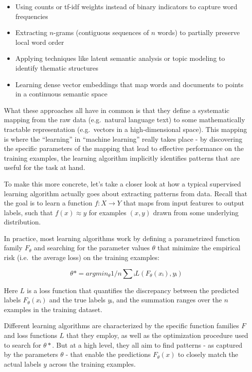 \documentclass[
  9pt,
  letterpaper,
  abstract,
  titlepage]{scrbook}
\begin{document}
\begin{itemize}
\item
  Using counts or tf-idf weights instead of binary indicators to capture
  word frequencies
\item
  Extracting \(n\)-grams (contiguous sequences of \(n\) words) to
  partially preserve local word order
\item
  Applying techniques like latent semantic analysis or topic modeling to
  identify thematic structures
\item
  Learning dense vector embeddings that map words and documents to
  points in a continuous semantic space
\end{itemize}

What these approaches all have in common is that they define a
systematic mapping from the raw data (e.g.~natural language text) to
some mathematically tractable representation (e.g.~vectors in a
high-dimensional space). This mapping is where the ``learning'' in
``machine learning'' really takes place - by discovering the specific
parameters of the mapping that lead to effective performance on the
training examples, the learning algorithm implicitly identifies patterns
that are useful for the task at hand.

To make this more concrete, let's take a closer look at how a typical
supervised learning algorithm actually goes about extracting patterns
from data. Recall that the goal is to learn a function \(f: X → Y\) that
maps from input features to output labels, such that \(f(x) ≈ y\) for
examples \((x,y)\) drawn from some underlying distribution.

In practice, most learning algorithms work by defining a parametrized
function family \(F_θ\) and searching for the parameter values \(θ\)
that minimize the empirical risk (i.e.~the average loss) on the training
examples:

\[θ* = argmin_θ 1/n ∑ᵢ L(F_θ(xᵢ), yᵢ)\]

Here \(L\) is a loss function that quantifies the discrepancy between
the predicted labels \(F_θ(xᵢ)\) and the true labels \(yᵢ\), and the
summation ranges over the \(n\) examples in the training dataset.

Different learning algorithms are characterized by the specific function
families \(F\) and loss functions \(L\) that they employ, as well as the
optimization procedure used to search for \(θ*\). But at a high level,
they all aim to find patterns - as captured by the parameters \(θ\) -
that enable the predictions \(F_θ(x)\) to closely match the actual
labels \(y\) across the training examples.
\end{document}
